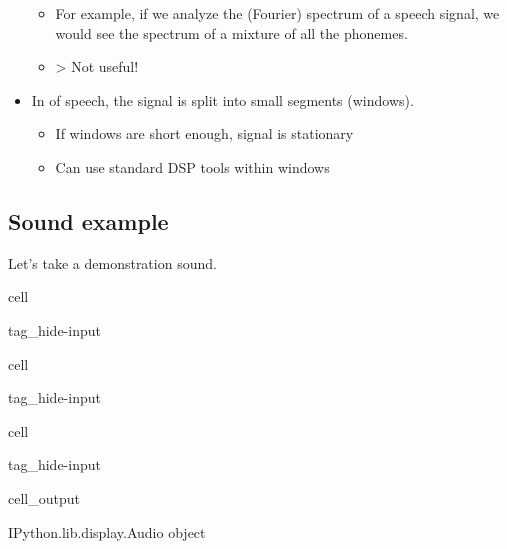 \documentclass[letterpaper,10pt,english]{jupyterBook}
\begin{document}
\begin{itemize}
\begin{itemize}
\item {} 
\sphinxAtStartPar
For example, if we analyze the (Fourier) spectrum of a speech signal, we would see the spectrum of a mixture of all the phonemes.

\item {} 
\sphinxAtStartPar
\sphinxhyphen{}> Not useful!

\end{itemize}

\item {} 
\sphinxAtStartPar
In  of speech, the signal is split into small segments (windows).
\begin{itemize}
\item {} 
\sphinxAtStartPar
If windows are short enough, signal is stationary

\item {} 
\sphinxAtStartPar
Can use standard DSP tools within windows

\end{itemize}

\end{itemize}


\subsection{Sound example}
\label{\detokenize{Representations/Short-time_analysis:sound-example}}
\sphinxAtStartPar
Let’s take a demonstration sound.

\begin{sphinxuseclass}{cell}
\begin{sphinxuseclass}{tag_hide-input}
\end{sphinxuseclass}
\end{sphinxuseclass}
\begin{sphinxuseclass}{cell}
\begin{sphinxuseclass}{tag_hide-input}
\end{sphinxuseclass}
\end{sphinxuseclass}
\begin{sphinxuseclass}{cell}
\begin{sphinxuseclass}{tag_hide-input}\begin{sphinxVerbatimOutput}

\begin{sphinxuseclass}{cell_output}
\begin{sphinxVerbatim}[commandchars=\\\{\}]
\PYGZlt{}IPython.lib.display.Audio object\PYGZgt{}
\end{sphinxVerbatim}

\noindent{}

\end{sphinxuseclass}\end{sphinxVerbatimOutput}

\end{sphinxuseclass}
\end{sphinxuseclass}
\end{document}
